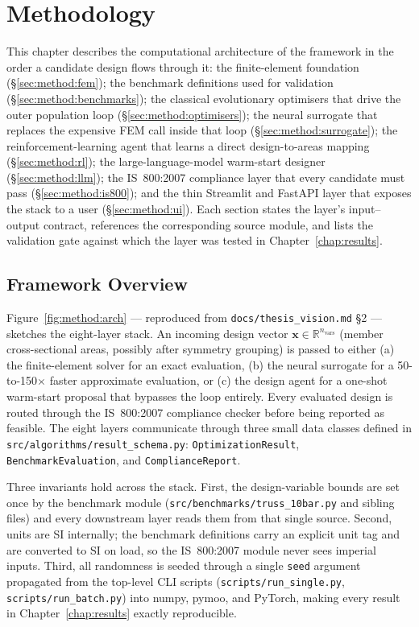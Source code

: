 \chapter{Methodology}
\label{chap:methodology}

This chapter describes the computational architecture of the
framework in the order a candidate design flows through it: the
finite-element foundation (\S\ref{sec:method:fem}); the benchmark
definitions used for validation (\S\ref{sec:method:benchmarks});
the classical evolutionary optimisers that drive the outer
population loop (\S\ref{sec:method:optimisers}); the neural
surrogate that replaces the expensive FEM call inside that loop
(\S\ref{sec:method:surrogate}); the reinforcement-learning agent
that learns a direct design-to-areas mapping
(\S\ref{sec:method:rl}); the large-language-model warm-start
designer (\S\ref{sec:method:llm}); the IS~800:2007 compliance
layer that every candidate must pass
(\S\ref{sec:method:is800}); and the thin Streamlit and FastAPI
layer that exposes the stack to a user
(\S\ref{sec:method:ui}). Each section states the layer's input--
output contract, references the corresponding source module, and
lists the validation gate against which the layer was tested in
Chapter~\ref{chap:results}.

\section{Framework Overview}
\label{sec:method:overview}

Figure~\ref{fig:method:arch} --- reproduced from \texttt{docs/thesis\_vision.md}
\S2 --- sketches the eight-layer stack. An incoming design vector
$\mathbf{x}\in\mathbb{R}^{n_\text{vars}}$ (member cross-sectional
areas, possibly after symmetry grouping) is passed to either (a)
the finite-element solver for an exact evaluation, (b) the neural
surrogate for a 50-to-150$\times$ faster approximate evaluation, or
(c) the design agent for a one-shot warm-start proposal that
bypasses the loop entirely. Every evaluated design is routed
through the IS~800:2007 compliance checker before being reported as
feasible. The eight layers communicate through three small data
classes defined in \texttt{src/algorithms/result\_schema.py}:
\texttt{OptimizationResult}, \texttt{BenchmarkEvaluation}, and
\texttt{ComplianceReport}.

Three invariants hold across the stack. First, the design-variable
bounds are set once by the benchmark module
(\texttt{src/benchmarks/truss\_10bar.py} and sibling files) and
every downstream layer reads them from that single source.
Second, units are SI internally; the benchmark definitions carry
an explicit unit tag and are converted to SI on load, so the
IS~800:2007 module never sees imperial inputs. Third, all randomness
is seeded through a single \texttt{seed} argument propagated
from the top-level CLI scripts (\texttt{scripts/run\_single.py},
\texttt{scripts/run\_batch.py}) into numpy, pymoo, and PyTorch,
making every result in Chapter~\ref{chap:results} exactly
reproducible.

